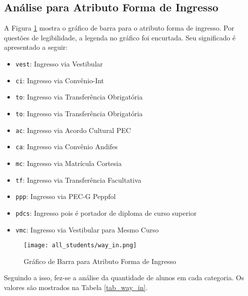 \subsection{Análise para Atributo Forma de Ingresso}
A Figura \ref{atr_way_in} mostra o gráfico de barra para o atributo forma de ingresso. 
Por questões de legibilidade, a legenda no gráfico foi encurtada. Seu significado é
apresentado a seguir: 
\begin{itemize}
    \item \texttt{vest}: Ingresso via Vestibular
    \item \texttt{ci}: Ingresso via Convênio-Int
    \item \texttt{to}: Ingresso via Transferência Obrigatória
    \item \texttt{to}: Ingresso via Transferência Obrigatória
    \item \texttt{ac}: Ingresso via Acordo Cultural PEC
    \item \texttt{ca}: Ingresso via Convênio Andifes
    \item \texttt{mc}: Ingresso via Matrícula Cortesia
    \item \texttt{tf}: Ingresso via Transferência Facultativa
    \item \texttt{ppp}: Ingresso via PEC-G Peppfol
    \item \texttt{pdcs}: Ingresso pois é portador de diploma de curso superior
    \item \texttt{vmc}: Ingresso via Vestibular para Mesmo Curso
\end{itemize}

\begin{figure}[!ht]
    \caption{Gráfico de Barra para Atributo Forma de Ingresso}
    \centering
    \texttt{[image: all\_students/way\_in.png]}
    \label{atr_way_in}
\end{figure}

Seguindo a isso, fez-se a análise da quantidade de alunos em cada categoria. Os
valores são mostrados na Tabela \ref{tab_way_in}.

